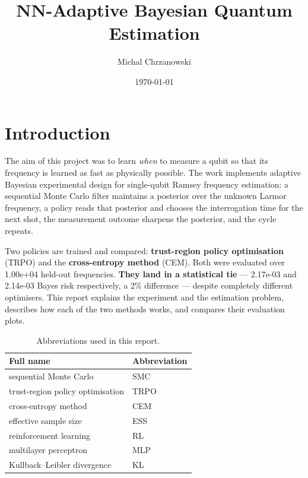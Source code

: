 \documentclass[12pt,a4paper]{article}
\title{NN-Adaptive Bayesian Quantum Estimation}
\author{Michal Chrzanowski}
\date{\today}
\begin{document}
\maketitle

\section*{Introduction}
The aim of this project was to learn \emph{when} to measure a qubit so that
its frequency is learned as fast as physically possible. The work implements
adaptive Bayesian experimental design for single-qubit Ramsey frequency
estimation: a sequential Monte Carlo filter maintains a posterior over the
unknown Larmor frequency, a policy reads that posterior and chooses the
interrogation time for the next shot, the measurement outcome sharpens the
posterior, and the cycle repeats.

Two policies are trained and compared: \textbf{trust-region policy
optimisation} (TRPO) and the \textbf{cross-entropy method} (CEM). Both were
evaluated over 1.00e+04 held-out frequencies. \textbf{They land in a
statistical tie} --- 2.17e-03 and 2.14e-03 Bayes risk respectively, a 2\%
difference --- despite completely different optimisers. This report explains
the experiment and the estimation problem, describes how each of the two
methods works, and compares their evaluation plots.

\begin{table}[H]
  \centering
  \caption{Abbreviations used in this report.}
  \label{tab:abbreviations}
  \small
  \begin{tabular}{@{}>{\raggedright\arraybackslash}p{}
                    >{\raggedright\arraybackslash}p{}@{}}
    \toprule
    Full name & Abbreviation \\
    \midrule
    sequential Monte Carlo & SMC \\
    trust-region policy optimisation & TRPO \\
    cross-entropy method & CEM \\
    effective sample size & ESS \\
    reinforcement learning & RL \\
    multilayer perceptron & MLP \\
    Kullback--Leibler divergence & KL \\
    \bottomrule
  \end{tabular}
\end{table}
\end{document}
